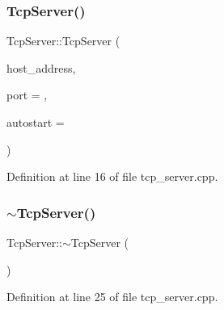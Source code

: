 \subsubsection{\texorpdfstring{TcpServer()}{TcpServer()}\hspace{0.1cm}{\footnotesize\ttfamily [3/3]}}
{\footnotesize\ttfamily Tcp\+Server\+::\+Tcp\+Server (\begin{DoxyParamCaption}\item[{Q\+String \&}]{host\+\_\+address,  }\item[{quint16}]{port = {},  }\item[{bool}]{autostart = {} }\end{DoxyParamCaption})}



Definition at line 16 of file tcp\+\_\+server.\+cpp.


\begin{DoxyCode}{0}

\end{DoxyCode}
\mbox{\label{class_tcp_server_a728a9e31c53cf86887f1f6149b1c46dd}} 
\subsubsection{\texorpdfstring{$\sim$TcpServer()}{~TcpServer()}}
{\footnotesize\ttfamily Tcp\+Server\+::$\sim$\+Tcp\+Server (\begin{DoxyParamCaption}{ }\end{DoxyParamCaption})}



Definition at line 25 of file tcp\+\_\+server.\+cpp.


\begin{DoxyCode}{0}

\end{DoxyCode}


